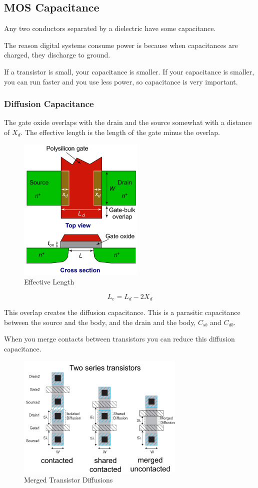 \documentclass{article}
\begin{document}
\subsection{MOS Capacitance}

Any two conductors separated by a dielectric have some capacitance.

The reason digital systems consume power is because when capacitances are charged, they discharge to ground.

If a transistor is small, your capacitance is smaller. If your capacitance is smaller, you can run faster and you use less power, so capacitance is very important.

\subsubsection{Diffusion Capacitance}

The gate oxide overlaps with the drain and the source somewhat with a distance of $X_d$. The effective length is the length of the gate minus the overlap.

\begin{figure}[ht!]
\centering
\includegraphics[width=60mm]{Length.png}
\caption{Effective Length}
\end{figure}


$$L_e = L_d - 2 X_d$$

This overlap creates the diffusion capacitance. This is a parasitic capacitance between the source and the body, and the drain and the body, $C_{sb}$ and $C_{db}$.

When you merge contacts between transistors you can reduce this diffusion capacitance.

\begin{figure}[ht!]
\centering
\includegraphics[width=80mm]{Diffusion.png}
\caption{Merged Transistor Diffusions}
\end{figure}
\end{document}

